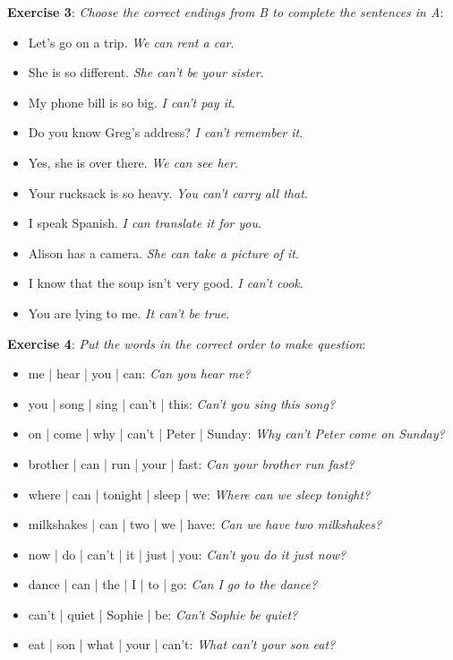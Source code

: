 \textbf{Exercise 3}: \textit{Choose the correct endings from B to complete the sentences in A}:

\begin{itemize}

\item Let's go on a trip. \textit{We can rent a car}.
\item She is so different. \textit{She can't be your sister}.
\item My phone bill is so big. \textit{I can't pay it}.
\item Do you know Greg's address? \textit{I can't remember it}.
\item Yes, she is over there. \textit{We can see her}.
\item Your rucksack is so heavy. \textit{You can't carry all that}.
\item I speak Spanish. \textit{I can translate it for you}.
\item Alison has a camera. \textit{She can take a picture of it}.
\item I know that the soup isn't very good. \textit{I can't cook}.
\item You are lying to me. \textit{It can't be true}.

\end{itemize}

\textbf{Exercise 4}: \textit{Put the words in the correct order to make question}:

\begin{itemize}

\item me | hear | you | can: \textit{Can you hear me?}
\item you | song | sing | can't | this: \textit{Can't you sing this song?}
\item on | come | why | can't | Peter | Sunday: \textit{Why can't Peter come on Sunday?}
\item brother | can | run | your | fast: \textit{Can your brother run fast?}
\item where | can | tonight | sleep | we: \textit{Where can we sleep tonight?}
\item milkshakes | can | two | we | have: \textit{Can we have two milkshakes?}
\item now | do | can't | it | just | you: \textit{Can't you do it just now?}
\item dance | can | the | I | to | go: \textit{Can I go to the dance?}
\item can't | quiet | Sophie | be: \textit{Can't Sophie be quiet?}
\item eat | son | what | your | can't: \textit{What can't your son eat?}

\end{itemize}

